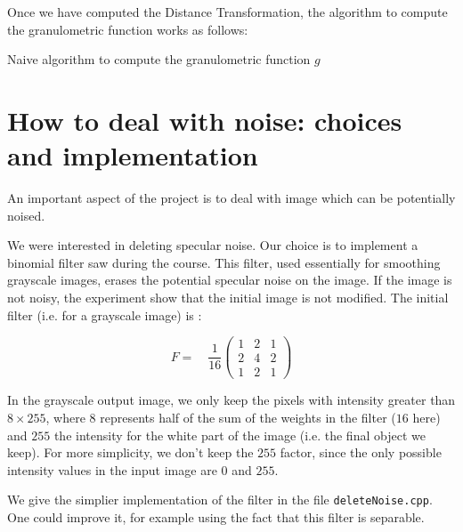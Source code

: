 Once we have computed the Distance Transformation, the algorithm to compute the granulometric function works as follows:

\IncMargin{1em}
\begin{algorithm}
\caption{Naive algorithm to compute the granulometric function $g$}
\label{algo-naive}
\end{algorithm}

\section{How to deal with noise: choices and implementation}

An important aspect of the project is to deal with image which can be potentially noised.

We were interested in deleting specular noise. Our choice is to implement a binomial filter saw during the course. This filter, used essentially for smoothing grayscale images, erases the potential specular noise on the image. If the image is not noisy, the experiment show that the initial image is not modified. The initial filter (i.e. for a grayscale image) is :

\setcounter{MaxMatrixCols}{3}
\[ F = \quad \frac{1}{16} \begin{pmatrix}
1 & 2 & 1 \\
2 & 4 & 2 \\
1 & 2 & 1
\end{pmatrix}\]

In the grayscale output image, we only keep the pixels with intensity greater than $8 \times 255$, where $8$ represents half of the sum of the weights in the filter ($16$ here) and $255$ the intensity for the white part of the image (i.e. the final object we keep). For more simplicity, we don't keep the $255$ factor, since the only possible intensity values in the input image are $0$ and $255$.

We give the simplier implementation of the filter in the file \texttt{deleteNoise.cpp}. One could improve it, for example using the fact that this filter is separable.


